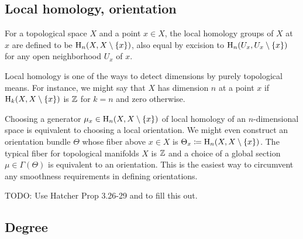 \subsection{Local homology, orientation}

\begin{defn}
    For a topological space $X$ and a point $x\in X$, the local homology groups of $X$ at $x$ are defined to be $\mathrm{H}_n(X,X\setminus\{x\})$, also equal by excision to $\mathrm{H}_n(U_x,U_x\setminus\{x\})$ for any open neighborhood $U_x$ of $x$.
\end{defn}

\begin{rem}
    Local homology is one of the ways to detect dimensions by purely topological means. For instance, we might say that $X$ has dimension $n$ at a point $x$ if $\mathrm{H}_k(X,X\setminus\{x\})$ is $\mathbb{Z}$ for $k=n$ and zero otherwise.
    
    Choosing a generator $\mu_x\in \mathrm{H}_n(X,X\setminus\{x\}) $ of local homology of an $n$-dimensional space is equivalent to choosing a local orientation. We might even construct an orientation bundle $\Theta$ whose fiber above $x\in X$ is $\Theta_x\coloneqq \mathrm{H}_n(X,X\setminus\{x\})$. The typical fiber for topological manifolds $X$ is $\mathbb{Z}$ and a choice of a global section $\mu\in\Gamma(\Theta)$ is equivalent to an orientation. This is the easiest way to circumvent any smoothness requirements in defining orientations.
\end{rem}

TODO: Use Hatcher Prop 3.26-29 and  to fill this out.





\subsection{Degree}

